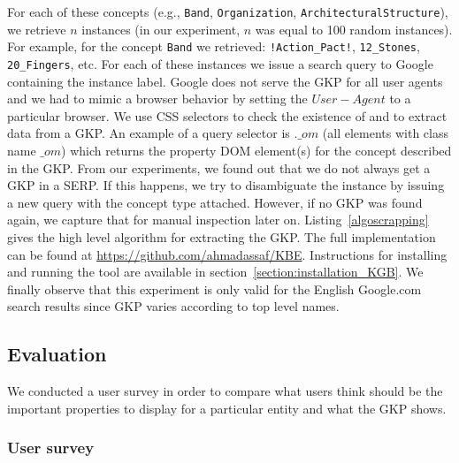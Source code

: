 \normalsize
For each of these concepts (e.g., \texttt{Band}, \texttt{Organization}, \texttt{ArchitecturalStructure}), we retrieve $n$ instances (in our experiment, $n$ was equal to 100 random instances). For example, for the concept \texttt{Band} we retrieved: \texttt{!Action\_Pact!}, \texttt{12\_Stones}, \texttt{20\_Fingers}, etc. For each of these instances we issue a search query to Google containing the instance label. Google does not serve the GKP for all user agents and we had to mimic a browser behavior by setting the $User-Agent$ to a particular browser. We use CSS selectors to check the existence of and to extract data from a GKP. An example of a query selector is $.\_om$ (all elements with class name $\_om$) which returns the property DOM element(s) for the concept described in the GKP. From our experiments, we found out that we do not always get a GKP in a SERP. If this happens, we try to disambiguate the instance by issuing a new query with the concept type attached. However, if no GKP was found again, we capture that for manual inspection later on. Listing~\ref{algoscrapping} gives the high level algorithm for extracting the GKP. The full implementation can be found at \url{https://github.com/ahmadassaf/KBE}. Instructions for installing and running the tool are available in section~\ref{section:installation_KGB}. We finally observe that this experiment is only valid for the English Google.com search results since GKP varies according to top level names.

\subsection{Evaluation}

We conducted a user survey in order to compare what users think should be the important properties to display for a particular entity and what the GKP shows.

\subsubsection{User survey}

